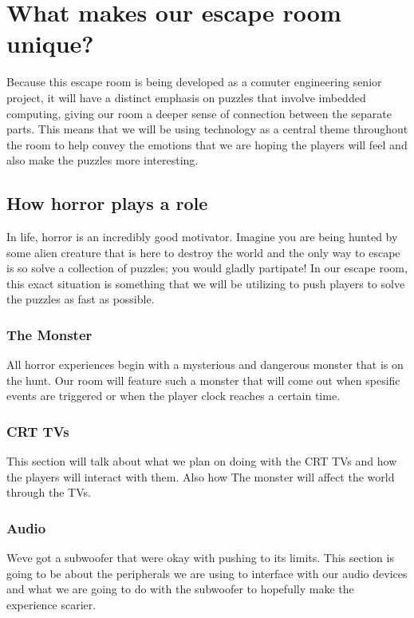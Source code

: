 \documentclass[conference]{IEEEtran}
\begin{document}
\section{What makes our escape room unique?}
Because this escape room is being developed as a comuter engineering senior project, it will have a distinct emphasis
on puzzles that involve imbedded computing, giving our room a deeper sense of connection between the separate parts.
This means that we will be using technology as a central theme throughout the room to help convey the emotions that we
are hoping the players will feel and also make the puzzles more interesting.

\subsection*{How horror plays a role}
In life, horror is an incredibly good motivator. Imagine you are being hunted by some alien creature that is here to
destroy the world and the only way to escape is so solve a collection of puzzles; you would gladly partipate!
In our escape room, this exact situation is something that we will be utilizing to push players to solve the puzzles
as fast as possible.

\subsubsection*{The Monster}
All horror experiences begin with a mysterious and dangerous monster that is on the hunt. Our room will feature such a monster
that will come out when spesific events are triggered or when the player clock reaches a certain time.

\subsubsection*{CRT TVs}
This section will talk about what we plan on doing with the CRT TVs and how the players will interact with them. Also how The
monster will affect the world through the TVs.

\subsubsection*{Audio}
Weve got a subwoofer that were okay with pushing to its limits. This section is going to be about the peripherals we are using
to interface with our audio devices and what we are going to do with the subwoofer to hopefully make the experience scarier.
\end{document}
